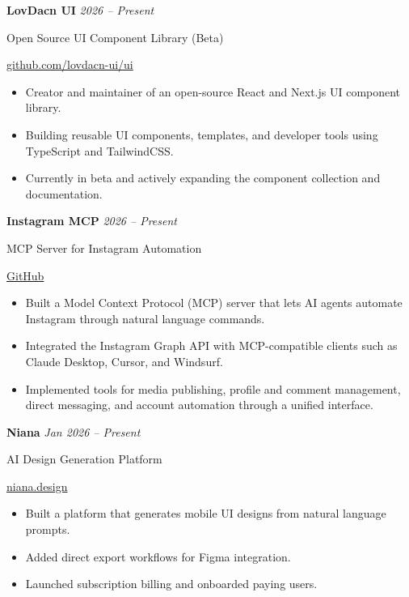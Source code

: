 \documentclass[11pt,letterpaper]{article}
\begin{document}
\vspace{5pt}

\textbf{LovDacn UI}
\hfill
\textit{2026 -- Present}

Open Source UI Component Library (Beta)

{\small
\href{https://github.com/lovdacn-ui/ui}{github.com/lovdacn-ui/ui}
}

\begin{itemize}
    \item Creator and maintainer of an open-source React and Next.js UI component library.
    \item Building reusable UI components, templates, and developer tools using TypeScript and TailwindCSS.
    \item Currently in beta and actively expanding the component collection and documentation.
\end{itemize}

\vspace{5pt}

\textbf{Instagram MCP}
\hfill
\textit{2026 -- Present}

MCP Server for Instagram Automation

{\small
\href{https://github.com/manideep1428/instagram_MCP}{GitHub}
}

\begin{itemize}
    \item Built a Model Context Protocol (MCP) server that lets AI agents automate Instagram through natural language commands.
    \item Integrated the Instagram Graph API with MCP-compatible clients such as Claude Desktop, Cursor, and Windsurf.
    \item Implemented tools for media publishing, profile and comment management, direct messaging, and account automation through a unified interface.
\end{itemize}

\vspace{5pt}

\textbf{Niana}
\hfill
\textit{Jan 2026 -- Present}

AI Design Generation Platform

{\small
\href{https://niana.design}{niana.design}
}

\begin{itemize}
    \item Built a platform that generates mobile UI designs from natural language prompts.
    \item Added direct export workflows for Figma integration.
    \item Launched subscription billing and onboarded paying users.
\end{itemize}
\end{document}
